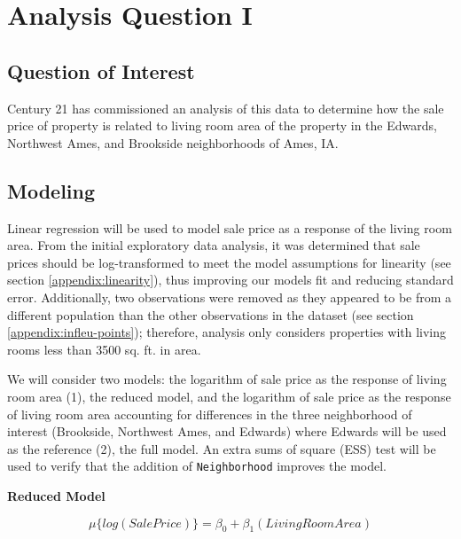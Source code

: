 \documentclass[american,]{article}
\begin{document}
\hypertarget{analysis-question-i}{%
\section{Analysis Question I}\label{analysis-question-i}}

\hypertarget{question-of-interest}{%
\subsection{Question of Interest}\label{question-of-interest}}

Century 21 has commissioned an analysis of this data to determine how
the sale price of property is related to living room area of the
property in the Edwards, Northwest Ames, and Brookside neighborhoods of
Ames, IA.

\hypertarget{modeling}{%
\subsection{Modeling}\label{modeling}}

Linear regression will be used to model sale price as a response of the
living room area. From the initial exploratory data analysis, it was
determined that sale prices should be log-transformed to meet the model
assumptions for linearity (see section \ref{appendix:linearity}), thus
improving our models fit and reducing standard error. Additionally, two
observations were removed as they appeared to be from a different
population than the other observations in the dataset (see section
\ref{appendix:infleu-points}); therefore, analysis only considers
properties with living rooms less than 3500 sq. ft. in area.

We will consider two models: the logarithm of sale price as the response
of living room area (1), the reduced model, and the logarithm of sale
price as the response of living room area accounting for differences in
the three neighborhood of interest (Brookside, Northwest Ames, and
Edwards) where Edwards will be used as the reference (2), the full
model. An extra sums of square (ESS) test will be used to verify that
the addition of \texttt{Neighborhood} improves the model.

\textbf{Reduced Model}

\begin{equation}
\mu \lbrace log(SalePrice) \rbrace = \beta_0 + \beta_1(LivingRoomArea) \label{eq:reduced}
\end{equation}
\end{document}

